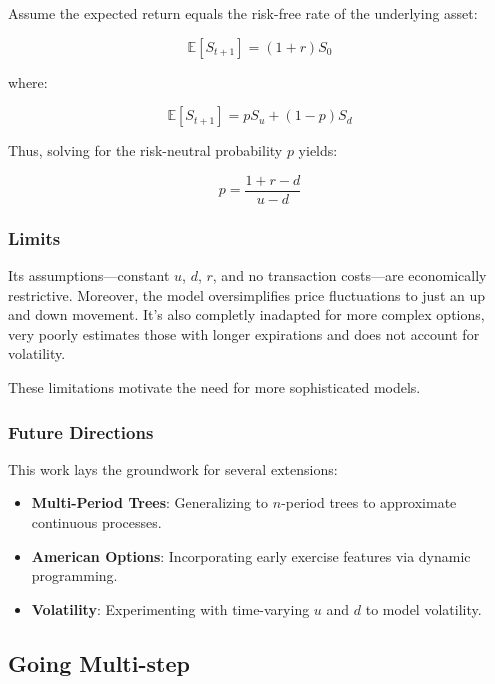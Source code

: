 \documentclass{article}
\begin{document}
    Assume the expected return equals the risk-free rate of the underlying asset:

    \[
        \mathbb{E}[S_{t+1}] = (1 + r) S_0
    \]


    where:

    \[
        \mathbb{E}[S_{t+1}] = p S_u + (1 - p) S_d
    \]

    Thus, solving for the risk-neutral probability \(p\) yields:

    \begin{equation}
        \label{eq:risk_neutral_prob_discrete}
        p = \frac{1 + r - d}{u - d}
    \end{equation}

    \subsubsection{Limits}

    Its assumptions---constant \( u \), \( d \), \( r \), and no transaction costs---are economically restrictive.
    Moreover, the model oversimplifies price fluctuations to just an up and down movement.
    It's also completly inadapted for more complex options, very poorly estimates those with longer expirations and does not account for volatility.

    \medskip

    These limitations motivate the need for more sophisticated models.

    \subsubsection{Future Directions}

    This work lays the groundwork for several extensions:

    \begin{itemize}
        \item \textbf{Multi-Period Trees}: Generalizing to \( n \)-period trees to approximate continuous processes.
        \item \textbf{American Options}: Incorporating early exercise features via dynamic programming.
        \item \textbf{Volatility}: Experimenting with time-varying \( u \) and \( d \) to model volatility.
    \end{itemize}


    \subsection{Going Multi-step}
\end{document}
